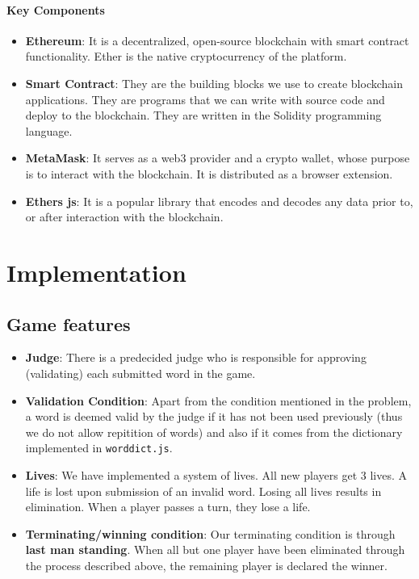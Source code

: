 \documentclass{article}
\begin{document}
\paragraph{Key Components}
\begin{itemize}
\item[] \textbf{Ethereum}: It is a decentralized, open-source blockchain with smart contract functionality. Ether is the native cryptocurrency of the platform.
\item[] \textbf{Smart Contract}: They are the building blocks we use to create blockchain applications. They are programs that we can write with source code and deploy to the blockchain. They are written in the Solidity programming language. 
\item[] \textbf{MetaMask}: It serves as a web3 provider and a crypto wallet, whose purpose is to interact with the blockchain. It is distributed as a browser extension. 
\item[] \textbf{Ethers js}: It is a popular library that encodes and decodes any data prior to, or after interaction with the blockchain.

\end{itemize}



\section{Implementation}

\subsection{Game features}

\begin{itemize}
    \item[] \textbf{Judge}:
    There is a predecided judge who is responsible for approving (validating) each
    submitted word in the game.
    \item[] \textbf{Validation Condition}:
    Apart from the condition mentioned in the problem, a word is deemed valid by the
    judge if it has not been used previously (thus we do not allow repitition of words)
    and also if it comes from the dictionary implemented in \verb|worddict.js|.
    \item[] \textbf{Lives}:
    We have implemented a system of lives. All new players get 3 lives. A life is lost upon submission of an invalid word. Losing all lives results in elimination. When a player passes a turn, they lose a life. 
    \item[] \textbf{Terminating/winning condition}: 
    Our terminating condition is through \textbf{last man standing}. When all but one
    player have been eliminated through the process described above, the remaining
    player is declared the winner.
    
\end{itemize}
\end{document}
